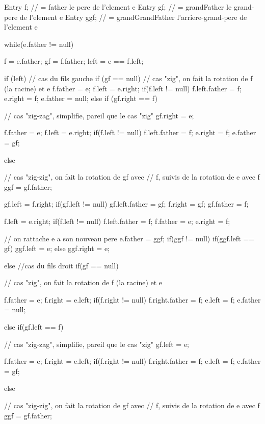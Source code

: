 \begin{hide}
\begin{code}
\begin{hide}
{      Entry f;     // = father             le pere de l'element e
      Entry gf;    // = grandFather        le grand-pere de l'element e
      Entry ggf;   // = grandGrandFather   l'arriere-grand-pere de l'element e

      while(e.father != null) {
         f = e.father;
         gf = f.father;
         left = e == f.left;

         if (left)
            // cas du fils gauche
            if (gf == null) {
               // cas "zig", on fait la rotation de f (la racine) et e
               f.father = e;
               f.left = e.right;
               if(f.left != null)
                  f.left.father = f;
               e.right = f;
               e.father = null;
            }
            else if (gf.right == f) {
               // cas "zig-zag", simplifie, pareil que le cas "zig"
               gf.right = e;

               f.father = e;
               f.left = e.right;
               if(f.left != null)
                  f.left.father = f;
               e.right = f;
               e.father = gf;
            }
            else {
               // cas "zig-zig", on fait la rotation de gf avec
               // f, suivis de la rotation de e avec f
               ggf = gf.father;

               gf.left = f.right;
               if(gf.left != null)
                  gf.left.father = gf;
               f.right = gf;
               gf.father = f;

               f.left = e.right;
               if(f.left != null)
                  f.left.father = f;
               f.father = e;
               e.right = f;

               // on rattache e a son nouveau pere
               e.father = ggf;
               if(ggf != null)
                  if(ggf.left == gf)
                     ggf.left = e;
                  else
                     ggf.right = e;
            }
         else
            //cas du fils droit
            if(gf == null) {
               // cas "zig", on fait la rotation de f (la racine) et e

               f.father = e;
               f.right = e.left;
               if(f.right != null)
                  f.right.father = f;
               e.left = f;
               e.father = null;
            }
            else if(gf.left == f) {
               // cas "zig-zag", simplifie, pareil que le cas "zig"
               gf.left = e;

               f.father = e;
               f.right = e.left;
               if(f.right != null)
                  f.right.father = f;
               e.left = f;
               e.father = gf;
            }
            else {
               // cas "zig-zig", on fait la rotation de gf avec
               // f, suivis de la rotation de e avec f
               ggf = gf.father;

}}}
\end{hide}
\end{code}
\end{hide}
